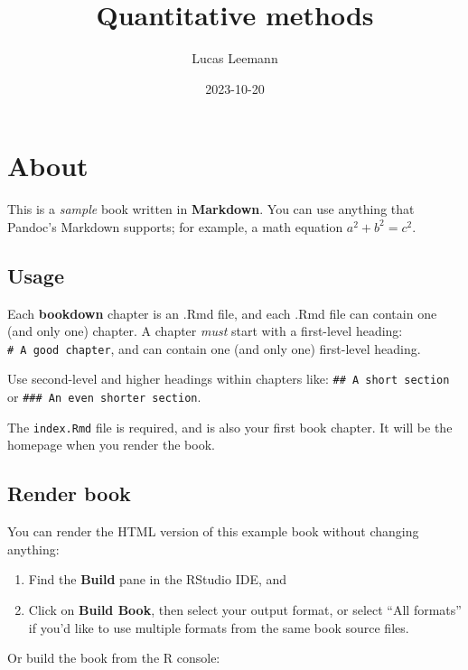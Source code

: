 \documentclass[
]{book}
\title{Quantitative methods}
\author{Lucas Leemann}
\date{2023-10-20}
\begin{document}
\maketitle

{
\setcounter{tocdepth}{1}
\tableofcontents
}
\hypertarget{about}{%
\chapter*{About}\label{about}}

This is a \emph{sample} book written in \textbf{Markdown}. You can use anything that Pandoc's Markdown supports; for example, a math equation \(a^2 + b^2 = c^2\).

\hypertarget{usage}{%
\section{Usage}\label{usage}}

Each \textbf{bookdown} chapter is an .Rmd file, and each .Rmd file can contain one (and only one) chapter. A chapter \emph{must} start with a first-level heading: \texttt{\#\ A\ good\ chapter}, and can contain one (and only one) first-level heading.

Use second-level and higher headings within chapters like: \texttt{\#\#\ A\ short\ section} or \texttt{\#\#\#\ An\ even\ shorter\ section}.

The \texttt{index.Rmd} file is required, and is also your first book chapter. It will be the homepage when you render the book.

\hypertarget{render-book}{%
\section{Render book}\label{render-book}}

You can render the HTML version of this example book without changing anything:

\begin{enumerate}
\def\labelenumi{\arabic{enumi}.}
\item
  Find the \textbf{Build} pane in the RStudio IDE, and
\item
  Click on \textbf{Build Book}, then select your output format, or select ``All formats'' if you'd like to use multiple formats from the same book source files.
\end{enumerate}

Or build the book from the R console:
\end{document}
